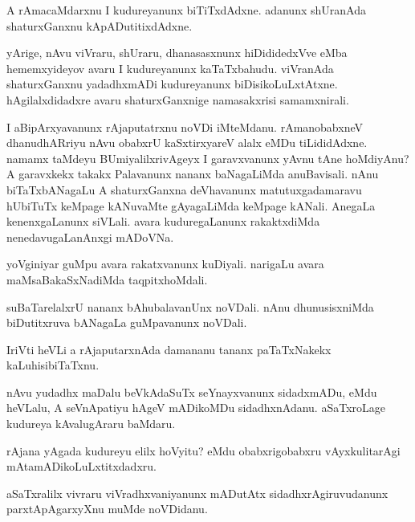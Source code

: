 \documentclass{article}
\begin{document}
\begin{mn}%
A rAmacaMdarxnu I kudureyanunx biTiTxdAdxne. adanunx shUranAda shaturxGanxnu 
kApADutitixdAdxne.
\end{mn}

\begin{mn}%
yArige, nAvu viVraru, shUraru, dhanasasxnunx hiDididedxVve eMba hememxyideyov avaru I 
kudureyanunx kaTaTxbahudu. viVranAda shaturxGanxnu yadadhxmADi kudureyanunx 
biDisikoLuLxtAtxne. hAgilalxdidadxre avaru shaturxGanxnige namasakxrisi samamxnirali.
\end{mn}

\begin{mn}%
I aBipArxyavanunx rAjaputatrxnu noVDi iMteMdanu. rAmanobabxneV dhanudhARriyu nAvu obabxrU 
kaSxtirxyareV alalx eMDu tiLididAdxne. namamx taMdeyu BUmiyalilxrivAgeyx I garavxvanunx 
yAvnu tAne hoMdiyAnu? A garavxkekx takakx Palavanunx nananx baNagaLiMda anuBavisali. nAnu 
biTaTxbANagaLu A shaturxGanxna deVhavanunx matutuxgadamaravu hUbiTuTx keMpage kANuvaMte 
gAyagaLiMda keMpage kANali. AnegaLa kenenxgaLanunx siVLali. avara kuduregaLanunx 
rakaktxdiMda nenedavugaLanAnxgi mADoVNa.
\end{mn}

\begin{mn}%
yoVginiyar guMpu avara rakatxvanunx kuDiyali. narigaLu avara maMsaBakaSxNadiMda 
taqpitxhoMdali.
\end{mn}

\begin{mn}%
suBaTarelalxrU nananx bAhubalavanUnx noVDali. nAnu dhunusisxniMda biDutitxruva bANagaLa 
guMpavanunx noVDali.
\end{mn}

\begin{mn}%
IriVti heVLi a rAjaputarxnAda damananu tananx paTaTxNakekx kaLuhisibiTaTxnu.
\end{mn}

\begin{mn}%
nAvu yudadhx maDalu beVkAdaSuTx seYnayxvanunx sidadxmADu, eMdu heVLalu, A seVnApatiyu 
hAgeV mADikoMDu sidadhxnAdanu. aSaTxroLage kudureya kAvalugAraru baMdaru.
\end{mn}

\begin{mn}%
rAjana yAgada kudureyu elilx hoVyitu? eMdu obabxrigobabxru vAyxkulitarAgi 
mAtamADikoLuLxtitxdadxru.
\end{mn}

\begin{mn}%
aSaTxralilx vivraru viVradhxvaniyanunx mADutAtx sidadhxrAgiruvudanunx parxtApAgarxyXnu 
muMde noVDidanu.
\end{mn}
\end{document}
